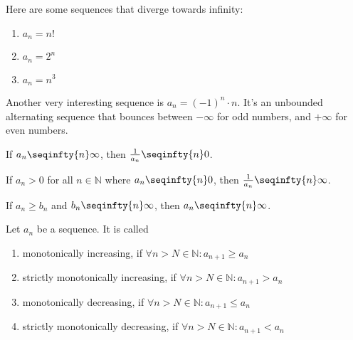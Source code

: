 \begin{rem}
	Here are some sequences that diverge towards infinity:
	\begin{enumerate}
		\item $a_n=n!$
		\item $a_n=2^n$
		\item $a_n=n^3$
	\end{enumerate}
	Another very interesting sequence is $a_n=(-1)^n\cdot n$. It's an unbounded
	alternating sequence that bounces between $-\infty$ for odd numbers, and
	$+\infty$ for even numbers.
\end{rem}

\begin{thm}\label{thm-sequence-infinity-zero}
	If $a_n \seqinfty{n} \infty$, then $\tfrac{1}{a_n} \seqinfty{n} 0$.
\end{thm}

\begin{thm}\label{thm-sequence-zero-infinity}
	If $a_n>0$ for all $n\in\mathbb{N}$ where $a_n \seqinfty{n} 0$, then
	$\tfrac{1}{a_n} \seqinfty{n} \infty$.
\end{thm}

\begin{thm}
	If $a_n \geq b_n$ and $b_n \seqinfty{n} \infty$, then $a_n \seqinfty{n} \infty$.
\end{thm}

\begin{definition}\label{def-monotonicity-sequences}
	Let $a_n$ be a sequence. It is called
	\begin{enumerate}
		\item monotonically increasing, if $\forall n>N\in\mathbb{N}:a_{n+1} \geq a_n$
		\item strictly monotonically increasing, if $\forall n>N\in\mathbb{N}:a_{n+1} > a_n$
		\item monotonically decreasing, if $\forall n>N\in\mathbb{N}:a_{n+1} \leq a_n$
		\item strictly monotonically decreasing, if $\forall n>N\in\mathbb{N}:a_{n+1} < a_n$
	\end{enumerate}
\end{definition}

